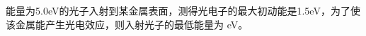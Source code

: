 \documentclass{njustexam}
\begin{document}


\begin{problem}
能量为5.0eV的光子入射到某金属表面，测得光电子的最大初动能是1.5eV，为了使该金属能产生光电效应，则入射光子的最低能量为 eV。                                              
\end{problem}







\end{document}
